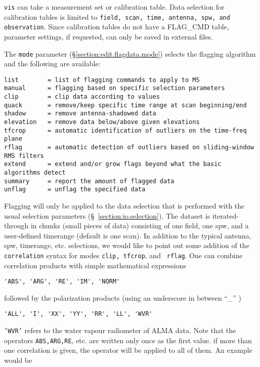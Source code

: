 {\tt vis} can take a measurement set or calibration table. Data
selection for calibration tables is limited to {\tt field, scan, time,
  antenna, spw, and observation}. Since calibration tables do not have
a FLAG\_CMD table, parameter settings, if requested, can only be
saved in external files. 

The {\tt mode} parameter (\S \ref{section:edit.flagdata.mode}) selects the flagging algorithm and the following are available:

\small
\begin{verbatim}
list        = list of flagging commands to apply to MS
manual      = flagging based on specific selection parameters
clip        = clip data according to values
quack       = remove/keep specific time range at scan beginning/end
shadow      = remove antenna-shadowed data
elevation   = remove data below/above given elevations
tfcrop      = automatic identification of outliers on the time-freq plane
rflag       = automatic detection of outliers based on sliding-window RMS filters
extend      = extend and/or grow flags beyond what the basic algorithms detect
summary     = report the amount of flagged data
unflag      = unflag the specified data
\end{verbatim}
\normalsize

Flagging will only be applied to the data selection that is performed
with the usual selection parameters (\S~\ref{section:io.selection}).
The dataset is iterated-through in chunks (small pieces of data)
consisting of one field, one spw, and a user-defined timerange
(default is one scan). In addition to the typical antenna, spw,
timerange, etc. selections, we would like to point out some addition
of the {\tt correlation} syntax for modes {\tt clip, tfcrop}, and {\tt
  rflag}. One can combine correlation products with simple
mathematical expressions  

\small
\begin{verbatim}
'ABS', 'ARG', 'RE', 'IM', 'NORM' 
\end{verbatim}
\normalsize
followed by the polarization products (using an underscore in between ``\_'' )

\small
\begin{verbatim}
'ALL', 'I', 'XX', 'YY', 'RR', 'LL', 'WVR' 
\end{verbatim}
\normalsize

{\tt 'WVR'} refers to the water vapour radiometer of ALMA data. Note that
the operators {\tt ABS,ARG,RE}, etc. are written only once as the first
value.  if more than one correlation is given, the operator will be
applied to all of them. An example would be 

